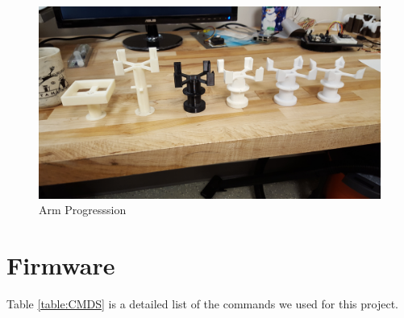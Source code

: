 \documentclass[final, letterpaper, 10 pt, conference, twocolumn]{IEEEtran}
\begin{document}
\begin{figure}[!ht]
\centering
\includegraphics[width=\linewidth]{ArmProgression.jpg}
\caption{Arm Progresssion}
\label{fig:Arm Progression}
\end{figure}


\section{Firmware}
Table \ref{table:CMDS} is a detailed list of the commands we used for this project.
\end{document}
